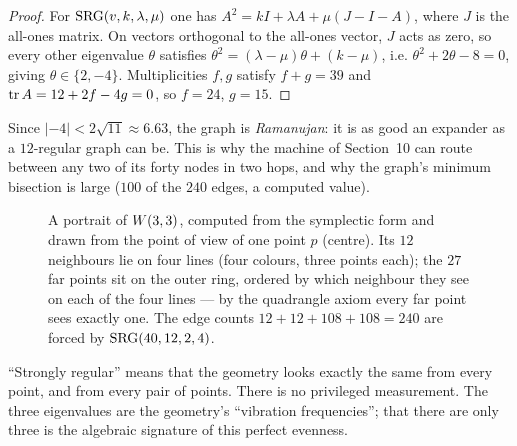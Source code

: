 \begin{proof}
For $\mathrm{SRG}(v,k,\lambda,\mu)$ one has $A^2=kI+\lambda A+\mu(J-I-A)$, where $J$ is the
all-ones matrix. On vectors orthogonal to the all-ones vector, $J$ acts as zero, so every
other eigenvalue $\theta$ satisfies $\theta^2=(\lambda-\mu)\theta+(k-\mu)$, i.e.
$\theta^2+2\theta-8=0$, giving $\theta\in\{2,-4\}$. Multiplicities $f,g$ satisfy
$f+g=39$ and $\operatorname{tr} A=12+2f-4g=0$, so $f=24$, $g=15$.
\end{proof}

Since $|-4|<2\sqrt{11}\approx6.63$, the graph is \emph{Ramanujan}: it is as good an
expander as a $12$-regular graph can be. This is why the machine of Section~10 can route
between any two of its forty nodes in two hops, and why the graph's minimum bisection is
large ($100$ of the $240$ edges, a computed value).

\begin{figure}[p]
\centering
{}

\medskip
{}
\caption{A portrait of $W(3,3)$, computed from the symplectic form and drawn from the point
of view of one point $p$ (centre). Its $12$ neighbours lie on four lines (four colours,
three points each); the $27$ far points sit on the outer ring, ordered by which neighbour
they see on each of the four lines --- by the quadrangle axiom every far point sees exactly
one. The edge counts $12+12+108+108=240$ are forced by $\mathrm{SRG}(40,12,2,4)$.}
\label{fig:portrait}
\end{figure}

\begin{plainwords}
``Strongly regular'' means that the geometry looks exactly the same from every point, and
from every pair of points. There is no privileged measurement. The three eigenvalues are
the geometry's ``vibration frequencies''; that there are only three is the algebraic
signature of this perfect evenness.
\end{plainwords}

